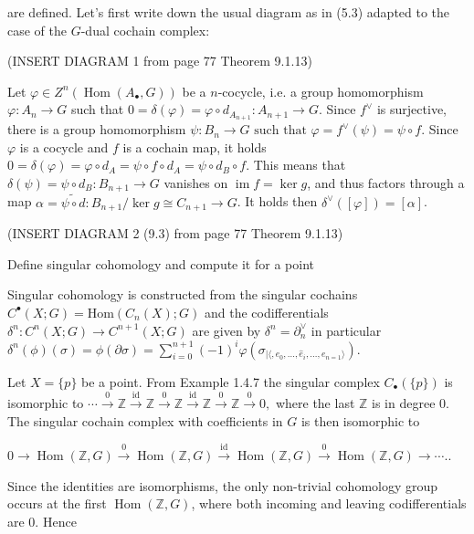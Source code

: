 are defined. Let's first write down the usual diagram as in (5.3) adapted to the case of the \(G\)-dual cochain complex:

(INSERT DIAGRAM 1 from page 77 Theorem 9.1.13)

Let \(\varphi \in Z^n(\operatorname{Hom}(A_\bullet, G))\) be a \( n \)-cocycle, i.e. a group homomorphism \( \varphi \colon A_n \to G \) such that 
\(0 = \delta(\varphi) = \varphi \circ d_{A_{n+1}} \colon A_{n+1} \to G.\)
Since \(f^\vee\) is surjective, there is a group homomorphism 
\(\psi \colon B_n \to G \text{ such that } \varphi = f^\vee(\psi) = \psi \circ f.\)
Since \(\varphi\) is a cocycle and \( f \) is a cochain map, it holds
\(0 = \delta(\varphi) = \varphi \circ d_A = \psi \circ f \circ d_A = \psi \circ d_B \circ f.\)
This means that \(\delta(\psi) = \psi \circ d_B \colon B_{n+1} \to G\) vanishes on \(\operatorname{im} f = \ker g\), 
and thus factors through a map \(\alpha = \widetilde{\psi \circ d} \colon B_{n+1}/ \ker g \cong C_{n+1} \to G\). 
It holds then \(\delta^\vee([\varphi]) = [\alpha]\).

(INSERT DIAGRAM 2 (9.3) from page 77 Theorem 9.1.13)


Define singular cohomology and compute it for a point

Singular cohomology is constructed from the singular cochains \( C^\bullet(X;G) = \text{Hom}(C_n(X);G) \) and the codifferentials
\( \delta^n : C^n(X;G) \to C^{n+1}(X;G) \) are given by \( \delta^n = \partial_n^\vee \) in particular
\( \delta^n(\phi)(\sigma) = \phi(\partial \sigma) = \sum_{i=0}^{n+1} (-1)^i\varphi(\sigma_{|\langle, e_0, \dots, \hat{e}_i, \dots, e_{n=1} \rangle})\).

Let \( X = \{p\} \) be a point. From Example 1.4.7 the singular complex \( C_{\bullet}(\{p\}) \) is isomorphic to
\(\cdots \xrightarrow{0} \mathbb{Z} \xrightarrow{\text{id}} \mathbb{Z} \xrightarrow{0} \mathbb{Z} \xrightarrow{\text{id}} \mathbb{Z} \xrightarrow{0} \mathbb{Z} \xrightarrow{0} 0, \)
where the last \(\mathbb{Z}\) is in degree \( 0 \). The singular cochain complex with coefficients in \(G\) is then isomorphic to

\(0 \longrightarrow \operatorname{Hom}(\mathbb{Z}, G) \xrightarrow{0} \operatorname{Hom}(\mathbb{Z}, G) \xrightarrow{\text{id}} \operatorname{Hom}(\mathbb{Z}, G) \xrightarrow{0} \operatorname{Hom}(\mathbb{Z}, G) \longrightarrow \dotsb .\).

Since the identities are isomorphisms, the only non-trivial cohomology group occurs at the first $\operatorname{Hom}(\mathbb{Z}, G)$, where both incoming and leaving codifferentials are 0. Hence


